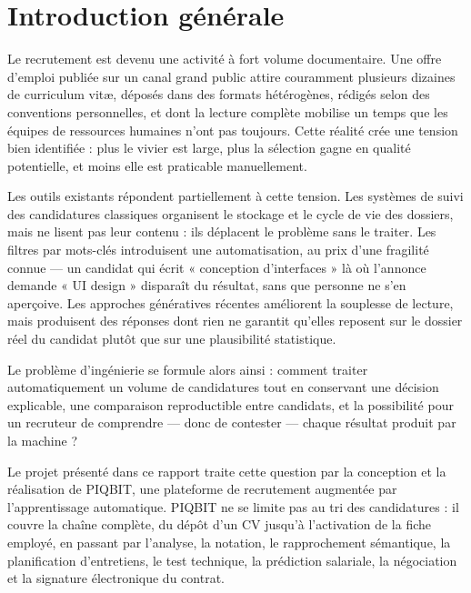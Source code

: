\chapter*{Introduction générale}

Le recrutement est devenu une activité à fort volume documentaire. Une offre
d'emploi publiée sur un canal grand public attire couramment plusieurs dizaines
de curriculum vitæ, déposés dans des formats hétérogènes, rédigés selon des
conventions personnelles, et dont la lecture complète mobilise un temps que les
équipes de ressources humaines n'ont pas toujours. Cette réalité crée une
tension bien identifiée : plus le vivier est large, plus la sélection gagne en
qualité potentielle, et moins elle est praticable manuellement.

Les outils existants répondent partiellement à cette tension. Les systèmes de
suivi des candidatures classiques organisent le stockage et le cycle de vie des
dossiers, mais ne lisent pas leur contenu : ils déplacent le problème sans le
traiter. Les filtres par mots-clés introduisent une automatisation, au prix
d'une fragilité connue — un candidat qui écrit « conception d'interfaces » là
où l'annonce demande « UI design » disparaît du résultat, sans que personne ne
s'en aperçoive. Les approches génératives récentes améliorent la souplesse de
lecture, mais produisent des réponses dont rien ne garantit qu'elles reposent
sur le dossier réel du candidat plutôt que sur une plausibilité statistique.

Le problème d'ingénierie se formule alors ainsi : comment traiter
automatiquement un volume de candidatures tout en conservant une décision
explicable, une comparaison reproductible entre candidats, et la possibilité
pour un recruteur de comprendre — donc de contester — chaque résultat produit
par la machine ?

Le projet présenté dans ce rapport traite cette question par la conception et
la réalisation de PIQBIT, une plateforme de recrutement augmentée par
l'apprentissage automatique. PIQBIT ne se limite pas au tri des candidatures :
il couvre la chaîne complète, du dépôt d'un CV jusqu'à l'activation de la fiche
employé, en passant par l'analyse, la notation, le rapprochement sémantique, la
planification d'entretiens, le test technique, la prédiction salariale, la
négociation et la signature électronique du contrat.

